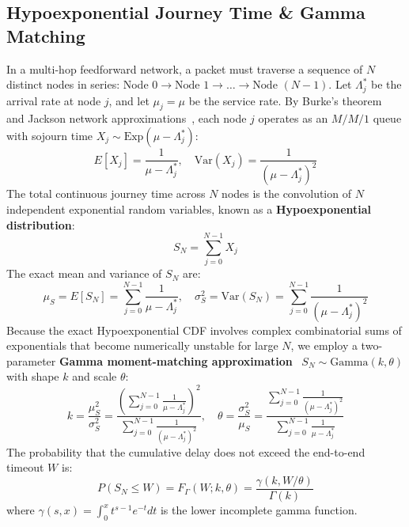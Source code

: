 \documentclass[12pt,onecolumn]{article}
\begin{document}
\subsection{Hypoexponential Journey Time \& Gamma Matching}
In a multi-hop feedforward network, a packet must traverse a sequence of $N$ distinct nodes in series: Node $0 \to \text{Node } 1 \to \dots \to \text{Node } (N-1)$. Let $\Lambda_j^*$ be the arrival rate at node $j$, and let $\mu_j = \mu$ be the service rate. By Burke's theorem~\cite{burke1956output} and Jackson network approximations~\cite{jackson1957networks, kleinrock1976computer}, each node $j$ operates as an $M/M/1$ queue with sojourn time $X_j \sim \text{Exp}(\mu - \Lambda_j^*)$:
\begin{equation}
E[X_j] = \frac{1}{\mu - \Lambda_j^*}, \quad \text{Var}(X_j) = \frac{1}{(\mu - \Lambda_j^*)^2}
\end{equation}
The total continuous journey time across $N$ nodes is the convolution of $N$ independent exponential random variables, known as a \textbf{Hypoexponential distribution}:
\begin{equation}
S_N = \sum_{j=0}^{N-1} X_j
\end{equation}
The exact mean and variance of $S_N$ are:
\begin{equation}
\mu_S = E[S_N] = \sum_{j=0}^{N-1} \frac{1}{\mu - \Lambda_j^*}, \quad \sigma_S^2 = \text{Var}(S_N) = \sum_{j=0}^{N-1} \frac{1}{(\mu - \Lambda_j^*)^2}
\end{equation}
Because the exact Hypoexponential CDF involves complex combinatorial sums of exponentials that become numerically unstable for large $N$, we employ a two-parameter \textbf{Gamma moment-matching approximation}~\cite{cox1955use, altiok1985approximate, ross1996stochastic} $S_N \sim \text{Gamma}(k, \theta)$ with shape $k$ and scale $\theta$:
\begin{equation}
k = \frac{\mu_S^2}{\sigma_S^2} = \frac{\left(\sum_{j=0}^{N-1} \frac{1}{\mu - \Lambda_j^*}\right)^2}{\sum_{j=0}^{N-1} \frac{1}{(\mu - \Lambda_j^*)^2}}, \quad \theta = \frac{\sigma_S^2}{\mu_S} = \frac{\sum_{j=0}^{N-1} \frac{1}{(\mu - \Lambda_j^*)^2}}{\sum_{j=0}^{N-1} \frac{1}{\mu - \Lambda_j^*}}
\label{eq:gamma_moments}
\end{equation}
The probability that the cumulative delay does not exceed the end-to-end timeout $W$ is:
\begin{equation}
P(S_N \le W) = F_\Gamma(W; k, \theta) = \frac{\gamma(k, W/\theta)}{\Gamma(k)}
\end{equation}
where $\gamma(s, x) = \int_0^x t^{s-1} e^{-t} dt$ is the lower incomplete gamma function.
\end{document}
